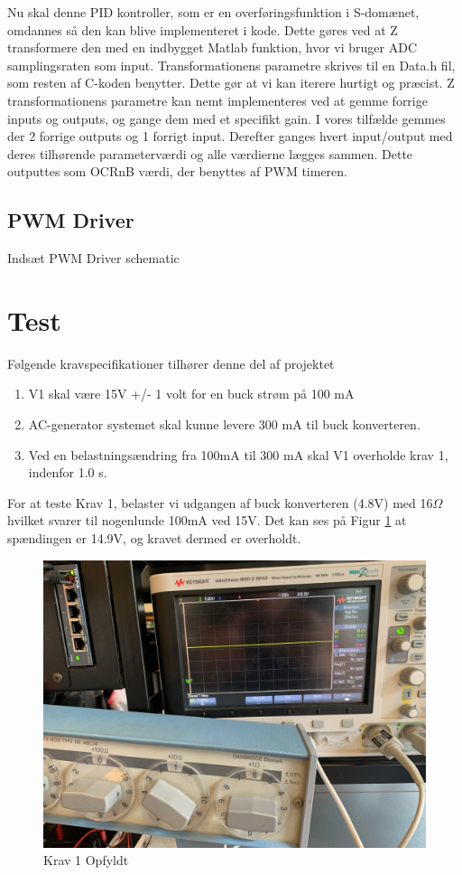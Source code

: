\documentclass[../main.tex]{subfiles}
\begin{document}
Nu skal denne PID kontroller, som er en overføringsfunktion i S-domænet, omdannes så den kan blive implementeret i kode. Dette gøres ved at Z transformere den med en indbygget Matlab funktion, hvor vi bruger ADC samplingsraten som input. Transformationens parametre skrives til en Data.h fil, som resten af C-koden benytter. Dette gør at vi kan iterere hurtigt og præcist. Z transformationens parametre kan nemt implementeres ved at gemme forrige inputs og outputs, og gange dem med et specifikt gain. I vores tilfælde gemmes der 2 forrige outputs og 1 forrigt input. Derefter ganges hvert input/output med deres tilhørende parameterværdi og alle værdierne lægges sammen. Dette outputtes som OCRnB værdi, der benyttes af PWM timeren.

\subsection{PWM Driver}
Indsæt PWM Driver schematic

\section{Test}
Følgende kravspecifikationer tilhører denne del af projektet
\begin{enumerate}
  \item V1 skal være 15V +/- 1 volt for en buck strøm på 100 mA
  \item AC-generator systemet skal kunne levere 300 mA til buck konverteren.
  \item Ved en belastningsændring fra 100mA til 300 mA skal V1 overholde krav 1, indenfor 1.0 s.
\end{enumerate}

For at teste Krav 1, belaster vi udgangen af buck konverteren (4.8V) med 16$\Omega$ hvilket svarer til nogenlunde 100mA ved 15V. Det kan ses på Figur \ref{fig: Krav 1 Opfyldt} at spændingen er 14.9V, og kravet dermed er overholdt.
\begin{figure}[H]
      \includegraphics[width=\textwidth]{Dokumentation/Pictures/Krav1.jpg}
     \caption{Krav 1 Opfyldt}
     \label{fig: Krav 1 Opfyldt}
     \end{figure}
\end{document}
